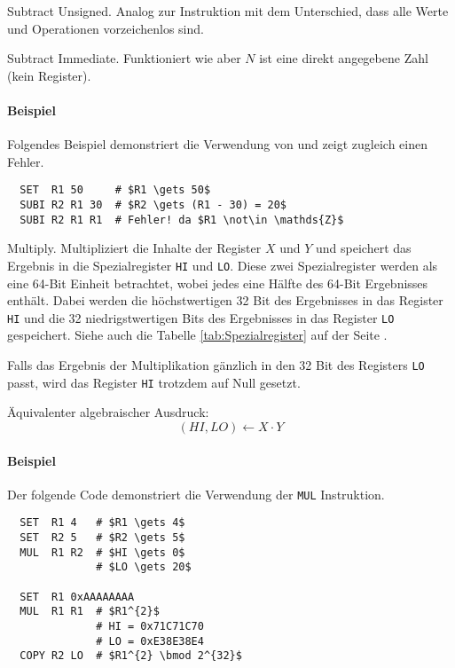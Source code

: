 \glqq Subtract Unsigned\grqq.
Analog zur Instruktion  mit dem Unterschied, dass alle Werte und
Operationen vorzeichenlos sind.


\glqq Subtract Immediate\grqq.
Funktioniert wie  aber $N$ ist eine direkt angegebene Zahl
(kein Register).

\paragraph{Beispiel}
Folgendes Beispiel demonstriert die Verwendung von  und zeigt
zugleich einen Fehler.
\begin{lstlisting}
  SET  R1 50     # $R1 \gets 50$
  SUBI R2 R1 30  # $R2 \gets (R1 - 30) = 20$
  SUBI R2 R1 R1  # Fehler! da $R1 \not\in \mathds{Z}$
\end{lstlisting}



\glqq Multiply\grqq. 
Multipliziert die Inhalte der Register $X$ und $Y$ und speichert das Ergebnis in
die Spezialregister \texttt{HI} und \texttt{LO}. Diese zwei Spezialregister
werden als eine 64-Bit Einheit betrachtet, wobei jedes eine Hälfte des
64-Bit Ergebnisses enthält.
Dabei werden die höchstwertigen 32 Bit des Ergebnisses in das Register
\texttt{HI}
und die 32 niedrigstwertigen Bits des Ergebnisses in das Register
\texttt{LO} gespeichert.
Siehe auch die Tabelle \ref{tab:Spezialregister} auf der Seite
\pageref{tab:Spezialregister}.

Falls das Ergebnis der Multiplikation gänzlich in den 32 Bit des Registers
\texttt{LO} passt, wird das Register \texttt{HI} trotzdem auf Null gesetzt.

Äquivalenter algebraischer Ausdruck:
\[
    (HI, LO) \gets X \cdot Y
\]

\paragraph{Beispiel} Der folgende Code demonstriert die Verwendung der
\texttt{MUL} Instruktion.
\begin{lstlisting}
  SET  R1 4   # $R1 \gets 4$
  SET  R2 5   # $R2 \gets 5$
  MUL  R1 R2  # $HI \gets 0$
              # $LO \gets 20$

  SET  R1 0xAAAAAAAA
  MUL  R1 R1  # $R1^{2}$
              # HI = 0x71C71C70
              # LO = 0xE38E38E4 
  COPY R2 LO  # $R1^{2} \bmod 2^{32}$ 
\end{lstlisting}



